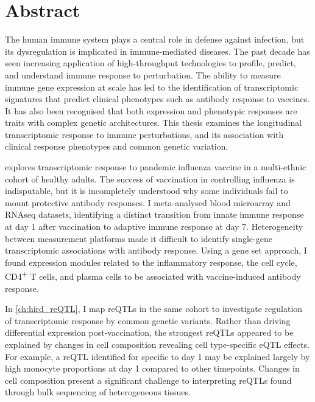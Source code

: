 %
%

\chapter{Abstract}

The human immune system plays a central role in defense against infection, 
but its dysregulation is implicated in immune-mediated diseases.
The past decade has seen increasing application of high-throughput technologies to profile, predict, and understand immune response to perturbation.
The ability to measure immune gene expression at scale has led to the identification of 
transcriptomic signatures that predict clinical phenotypes such as antibody response to vaccines.
It has also been recognised that both expression and phenotypic responses are traits with complex genetic architectures.
This thesis examines the longitudinal transcriptomic response to immune perturbations,
and its association with clinical response phenotypes and common genetic variation.

 explores transcriptomic response to pandemic influenza vaccine in a multi-ethnic cohort of healthy adults.
The success of vaccination in controlling influenza is indisputable, 
but it is incompletely understood why some individuals fail to mount protective antibody responses.
I meta-analysed blood microarray and \gls{RNAseq} datasets, 
identifying a distinct transition from innate immune response at day 1 after vaccination to adaptive immune response at day 7.
Heterogeneity between measurement platforms made it difficult to identify single-gene transcriptomic associations with antibody response.
Using a gene set approach, I found expression modules related to the inflammatory response, the cell cycle, CD4\textsuperscript{+} T cells, and plasma cells 
to be associated with vaccine-induced antibody response.

In \cref{ch:hird_reQTL}, I map \glspl{reQTL} in the same cohort to investigate regulation of transcriptomic response by common genetic variants.
Rather than driving differential expression post-vaccination,
the strongest \glspl{reQTL} appeared to be explained by changes in cell composition revealing cell type-specific \gls{eQTL} effects.
For example, a \gls{reQTL} identified for  specific to day 1 may be explained largely by high monocyte proportions at day 1 compared to other timepoints.
Changes in cell composition present a significant challenge to interpreting \glspl{reQTL} found through bulk sequencing of heterogeneous tissues.

